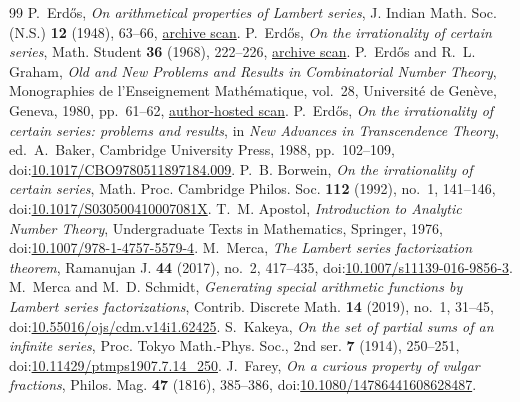 \documentclass[11pt]{article}
\theoremstyle{definition}
\theoremstyle{remark}
\begin{document}
\fi

\clearpage
\begin{thebibliography}{99}
\small
\setlength{\itemsep}{0pt}
 P.~Erd\H{o}s, \emph{On arithmetical properties of Lambert series},
  J. Indian Math. Soc. (N.S.) \textbf{12} (1948), 63--66,
  \href{https://users.renyi.hu/~p_erdos/1948-04.pdf}{archive scan}.
 P.~Erd\H{o}s, \emph{On the irrationality of certain series},
  Math. Student \textbf{36} (1968), 222--226,
  \href{https://users.renyi.hu/~p_erdos/1969-09.pdf}{archive scan}.
 P.~Erd\H{o}s and R.~L. Graham, \emph{Old and New Problems and
  Results in Combinatorial Number Theory}, Monographies de l'Enseignement
  Math\'ematique, vol.~28, Universit\'e de Gen\`eve, Geneva, 1980, pp.~61--62,
  \href{https://mathweb.ucsd.edu/~ronspubs/80_11_number_theory.pdf}{author-hosted scan}.
 P.~Erd\H{o}s, \emph{On the irrationality of certain series: problems and
  results}, in \emph{New Advances in Transcendence Theory}, ed.~A.~Baker,
  Cambridge University Press, 1988, pp.~102--109,
  doi:\href{https://doi.org/10.1017/CBO9780511897184.009}{10.1017/CBO9780511897184.009}.
 P.~B. Borwein, \emph{On the irrationality of certain series},
  Math. Proc. Cambridge Philos. Soc. \textbf{112} (1992), no.~1, 141--146,
  doi:\href{https://doi.org/10.1017/S030500410007081X}{10.1017/S030500410007081X}.
 T.~M. Apostol, \emph{Introduction to Analytic Number Theory},
  Undergraduate Texts in Mathematics, Springer, 1976,
  doi:\href{https://doi.org/10.1007/978-1-4757-5579-4}{10.1007/978-1-4757-5579-4}.
 M.~Merca, \emph{The Lambert series factorization theorem},
  Ramanujan J. \textbf{44} (2017), no.~2, 417--435,
  doi:\href{https://doi.org/10.1007/s11139-016-9856-3}{10.1007/s11139-016-9856-3}.
 M.~Merca and M.~D. Schmidt, \emph{Generating special arithmetic
  functions by Lambert series factorizations}, Contrib. Discrete Math. \textbf{14}
  (2019), no.~1, 31--45,
  doi:\href{https://doi.org/10.55016/ojs/cdm.v14i1.62425}{10.55016/ojs/cdm.v14i1.62425}.
 S.~Kakeya, \emph{On the set of partial sums of an infinite series},
  Proc. Tokyo Math.-Phys. Soc., 2nd ser. \textbf{7} (1914), 250--251,
  doi:\href{https://doi.org/10.11429/ptmps1907.7.14_250}{10.11429/ptmps1907.7.14\_250}.
 J.~Farey, \emph{On a curious property of vulgar fractions},
  Philos. Mag. \textbf{47} (1816), 385--386,
  doi:\href{https://doi.org/10.1080/14786441608628487}{10.1080/14786441608628487}.

\end{thebibliography}
\end{document}
